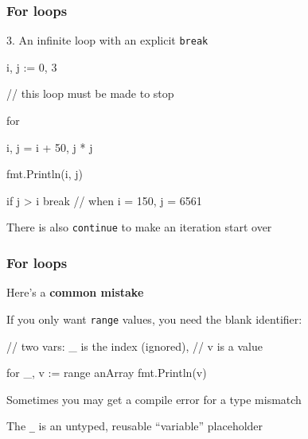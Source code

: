 \documentclass[handout,compress,t,11pt]{beamer}
\begin{document}
\begin{frame}[fragile]
    \frametitle{For loops}
    3. An infinite loop with an explicit \verb|break|
\begin{golang}
    i, j := 0, 3

    // this loop must be made to stop

    for {
        i, j = i + 50, j * j
        
        fmt.Println(i, j)

        if j > i {
            break       // when i = 150, j = 6561
        }
    }
\end{golang}
    \vspace{0.5\baselineskip}
    There is also \verb|continue| to make an iteration start over
\end{frame}

\begin{frame}[fragile]
    \frametitle{For loops}
    Here's a {\bf common mistake} \par
    \vspace{0.5\baselineskip}
    If you only want \verb|range| values, you need the blank identifier:
\begin{golang}
    // two vars: _ is the index (ignored), 
    // v is a value

    for _, v := range anArray {
        fmt.Println(v)
    }
\end{golang}
    \vspace{1.5\baselineskip}
    Sometimes you may get a compile error for a type mismatch \par
    \vspace{\baselineskip}
    The \verb|_| is an untyped, reusable ``variable'' placeholder \par
\end{frame}

\end{document}
